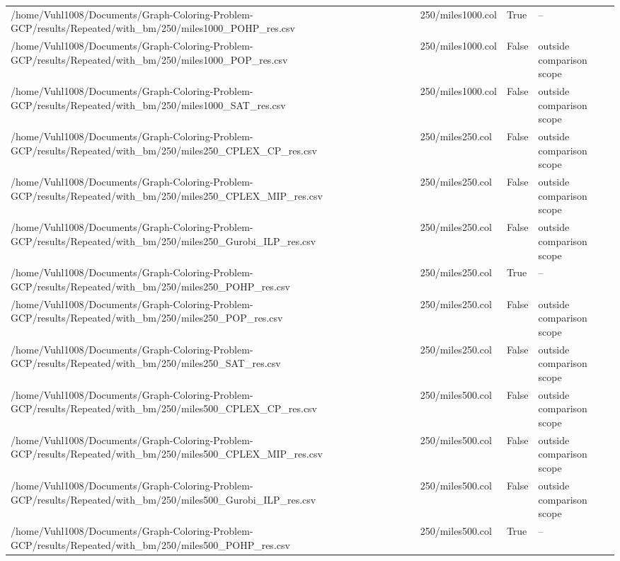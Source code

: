 \begin{table}[htbp]
\begin{tabular}{llll}
/home/Vuhl1008/Documents/Graph-Coloring-Problem-GCP/results/Repeated/with\_bm/250/miles1000\_POHP\_res.csv & 250/miles1000.col & True & -- \\
/home/Vuhl1008/Documents/Graph-Coloring-Problem-GCP/results/Repeated/with\_bm/250/miles1000\_POP\_res.csv & 250/miles1000.col & False & outside comparison scope \\
/home/Vuhl1008/Documents/Graph-Coloring-Problem-GCP/results/Repeated/with\_bm/250/miles1000\_SAT\_res.csv & 250/miles1000.col & False & outside comparison scope \\
/home/Vuhl1008/Documents/Graph-Coloring-Problem-GCP/results/Repeated/with\_bm/250/miles250\_CPLEX\_CP\_res.csv & 250/miles250.col & False & outside comparison scope \\
/home/Vuhl1008/Documents/Graph-Coloring-Problem-GCP/results/Repeated/with\_bm/250/miles250\_CPLEX\_MIP\_res.csv & 250/miles250.col & False & outside comparison scope \\
/home/Vuhl1008/Documents/Graph-Coloring-Problem-GCP/results/Repeated/with\_bm/250/miles250\_Gurobi\_ILP\_res.csv & 250/miles250.col & False & outside comparison scope \\
/home/Vuhl1008/Documents/Graph-Coloring-Problem-GCP/results/Repeated/with\_bm/250/miles250\_POHP\_res.csv & 250/miles250.col & True & -- \\
/home/Vuhl1008/Documents/Graph-Coloring-Problem-GCP/results/Repeated/with\_bm/250/miles250\_POP\_res.csv & 250/miles250.col & False & outside comparison scope \\
/home/Vuhl1008/Documents/Graph-Coloring-Problem-GCP/results/Repeated/with\_bm/250/miles250\_SAT\_res.csv & 250/miles250.col & False & outside comparison scope \\
/home/Vuhl1008/Documents/Graph-Coloring-Problem-GCP/results/Repeated/with\_bm/250/miles500\_CPLEX\_CP\_res.csv & 250/miles500.col & False & outside comparison scope \\
/home/Vuhl1008/Documents/Graph-Coloring-Problem-GCP/results/Repeated/with\_bm/250/miles500\_CPLEX\_MIP\_res.csv & 250/miles500.col & False & outside comparison scope \\
/home/Vuhl1008/Documents/Graph-Coloring-Problem-GCP/results/Repeated/with\_bm/250/miles500\_Gurobi\_ILP\_res.csv & 250/miles500.col & False & outside comparison scope \\
/home/Vuhl1008/Documents/Graph-Coloring-Problem-GCP/results/Repeated/with\_bm/250/miles500\_POHP\_res.csv & 250/miles500.col & True & -- \\

\end{tabular}
\end{table}
